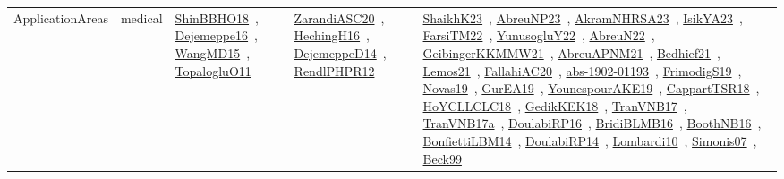 {\begin{longtable}{lp{3cm}>{\raggedright\arraybackslash}p{6cm}>{\raggedright\arraybackslash}p{6cm}>{\raggedright\arraybackslash}p{8cm}}
ApplicationAreas & medical & \href{works/ShinBBHO18.pdf}{ShinBBHO18}~\cite{ShinBBHO18}, \href{works/Dejemeppe16.pdf}{Dejemeppe16}~\cite{Dejemeppe16}, \href{works/WangMD15.pdf}{WangMD15}~\cite{WangMD15}, \href{works/TopalogluO11.pdf}{TopalogluO11}~\cite{TopalogluO11} & \href{works/ZarandiASC20.pdf}{ZarandiASC20}~\cite{ZarandiASC20}, \href{works/HechingH16.pdf}{HechingH16}~\cite{HechingH16}, \href{works/DejemeppeD14.pdf}{DejemeppeD14}~\cite{DejemeppeD14}, \href{works/RendlPHPR12.pdf}{RendlPHPR12}~\cite{RendlPHPR12} & \href{works/ShaikhK23.pdf}{ShaikhK23}~\cite{ShaikhK23}, \href{works/AbreuNP23.pdf}{AbreuNP23}~\cite{AbreuNP23}, \href{works/AkramNHRSA23.pdf}{AkramNHRSA23}~\cite{AkramNHRSA23}, \href{works/IsikYA23.pdf}{IsikYA23}~\cite{IsikYA23}, \href{works/FarsiTM22.pdf}{FarsiTM22}~\cite{FarsiTM22}, \href{works/YunusogluY22.pdf}{YunusogluY22}~\cite{YunusogluY22}, \href{works/AbreuN22.pdf}{AbreuN22}~\cite{AbreuN22}, \href{works/GeibingerKKMMW21.pdf}{GeibingerKKMMW21}~\cite{GeibingerKKMMW21}, \href{works/AbreuAPNM21.pdf}{AbreuAPNM21}~\cite{AbreuAPNM21}, \href{works/Bedhief21.pdf}{Bedhief21}~\cite{Bedhief21}, \href{works/Lemos21.pdf}{Lemos21}~\cite{Lemos21}, \href{works/FallahiAC20.pdf}{FallahiAC20}~\cite{FallahiAC20}, \href{works/abs-1902-01193.pdf}{abs-1902-01193}~\cite{abs-1902-01193}, \href{works/FrimodigS19.pdf}{FrimodigS19}~\cite{FrimodigS19}, \href{works/Novas19.pdf}{Novas19}~\cite{Novas19}, \href{works/GurEA19.pdf}{GurEA19}~\cite{GurEA19}, \href{works/YounespourAKE19.pdf}{YounespourAKE19}~\cite{YounespourAKE19}, \href{works/CappartTSR18.pdf}{CappartTSR18}~\cite{CappartTSR18}, \href{works/HoYCLLCLC18.pdf}{HoYCLLCLC18}~\cite{HoYCLLCLC18}, \href{works/GedikKEK18.pdf}{GedikKEK18}~\cite{GedikKEK18}, \href{works/TranVNB17.pdf}{TranVNB17}~\cite{TranVNB17}, \href{works/TranVNB17a.pdf}{TranVNB17a}~\cite{TranVNB17a}, \href{works/DoulabiRP16.pdf}{DoulabiRP16}~\cite{DoulabiRP16}, \href{works/BridiBLMB16.pdf}{BridiBLMB16}~\cite{BridiBLMB16}, \href{works/BoothNB16.pdf}{BoothNB16}~\cite{BoothNB16}, \href{works/BonfiettiLBM14.pdf}{BonfiettiLBM14}~\cite{BonfiettiLBM14}, \href{works/DoulabiRP14.pdf}{DoulabiRP14}~\cite{DoulabiRP14}, \href{works/Lombardi10.pdf}{Lombardi10}~\cite{Lombardi10}, \href{works/Simonis07.pdf}{Simonis07}~\cite{Simonis07}, \href{works/Beck99.pdf}{Beck99}~\cite{Beck99}\\

\end{longtable}}

